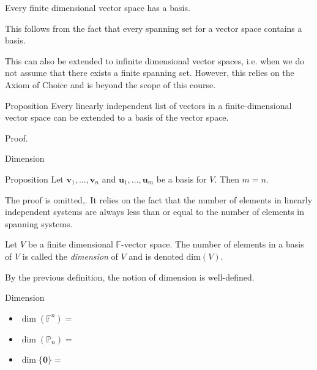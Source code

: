 \documentclass [aspectratio=169]{beamer}
\newcommand{\bu}{{\mathbf{u}}}
\newcommand{\bv}{{\mathbf{v}}}
\newcommand{\zerovec}{{\mathbf{0}}}
\newcommand{\F}{{\mathbb{F}}}
\begin{document}
\begin{frame}
\begin{corollary}
Every finite dimensional vector space has a basis.
\end{corollary}

This follows from the fact that every spanning set for a vector space contains a basis.

\vspace{1em}

This can also be extended to infinite dimensional vector spaces, i.e. when we do not assume that there exists a finite spanning set. However, this relies on the Axiom of Choice and is beyond the scope of this course.
\end{frame}

\begin{frame}
\begin{exampleblock}{Proposition}
Every linearly independent list of vectors in a finite-dimensional vector space can be extended to a basis of the vector space.
 \end{exampleblock}
\begin{block}{Proof.}
\vspace{4cm}
\end{block}
\end{frame}



\begin{frame}{Dimension}
\begin{exampleblock}{Proposition}
Let $\bv_1,\ldots, \bv_n$ and $\bu_1,\ldots, \bu_m$ be a basis for $V$. Then $m=n$.
 \end{exampleblock}

The proof is omitted,. It relies on the fact that the number of elements in linearly independent systems are always less than or equal to the number of elements in spanning systems. 

\begin{definition}
Let $V$ be a finite dimensional $\F$-vector space. The number of elements in a basis of $V$ is called the \emph{dimension} of $V$ and is denoted $\mathrm{dim}(V)$.
\end{definition}

By the previous definition, the notion of dimension is well-defined. 
\end{frame}

\begin{frame}{Dimension}
\begin{example}
\begin{itemize}
      \setlength\itemsep{0.7em}
    \item $\dim(\F^n) = $
    \item $\dim(\mathbb{P}_n)= $
    \item $\dim \{ \zerovec \} = $ 
\end{itemize}
\vspace{2em}
\end{example}
\end{frame}
\end{document}
